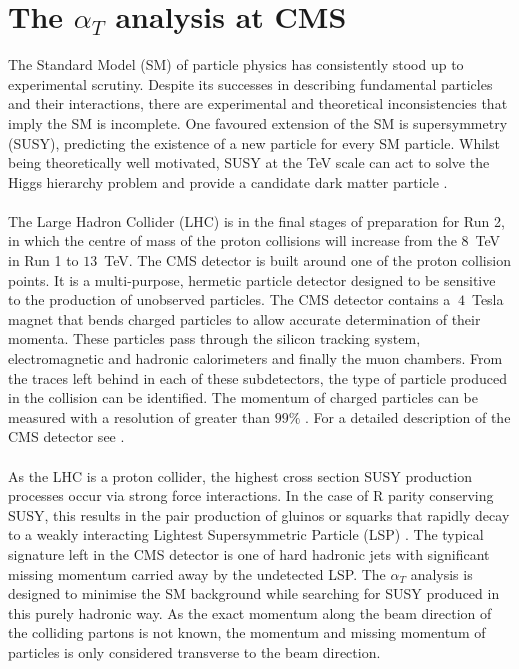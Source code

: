 
\section{The \boldmath $\alpha_T$ analysis at CMS}
\label{sec:Introduction}


The Standard Model (SM) of particle physics \cite{Salam1964,Glashow1961,Weinberg1967} has consistently stood up to experimental scrutiny. Despite its successes in describing fundamental particles and their interactions, there are experimental and theoretical inconsistencies that imply the SM is incomplete. One favoured extension of the SM is supersymmetry (SUSY), predicting the existence of a new particle for every SM particle. Whilst being theoretically well motivated, SUSY at the TeV scale can act to solve the Higgs hierarchy problem and provide a candidate dark matter particle \cite{SUSYprimerMartin:1997ns,susy1,susy2,susy3,susy4,susy5,susy6}.
\\\\
The Large Hadron Collider (LHC) \cite{LHCMachine} is in the final stages of preparation for Run 2, in which the centre of mass of the proton collisions will increase from the $8$~TeV in Run 1 to $13$~TeV. The CMS detector is built around one of the proton collision points. It is a multi-purpose, hermetic particle detector designed to be sensitive to the production of unobserved particles. The CMS detector contains a $~4$~Tesla magnet that bends charged particles to allow accurate determination of their momenta. These particles pass through the silicon tracking system, electromagnetic and hadronic calorimeters and finally the muon chambers. From the traces left behind in each of these subdetectors, the type of particle produced in the collision can be identified. The momentum of charged particles can be measured with a resolution of greater than $99\%$ \cite{ScienceArticle} \cite{CMSTechDesign1DetectorPerformance}. For a detailed description of the CMS detector see \cite{CMS_Overview_Chatrchyan:2008aa}.
\\\\
As the LHC is a proton collider, the highest cross section SUSY production processes occur via strong force interactions. In the case of R parity conserving SUSY, this results in the pair production of gluinos or squarks that rapidly decay to a weakly interacting Lightest Supersymmetric Particle (LSP) \cite{SUSYPhe_hadronic_states_Farrar:1978xj}. The typical signature left in the CMS detector is one of hard hadronic jets with significant missing momentum carried away by the undetected LSP. The $\alpha_T$ analysis is designed to minimise the SM background while searching for SUSY produced in this purely hadronic way. As the exact momentum along the beam direction of the colliding partons is not known, the momentum and missing momentum of particles is only considered transverse to the beam direction.

